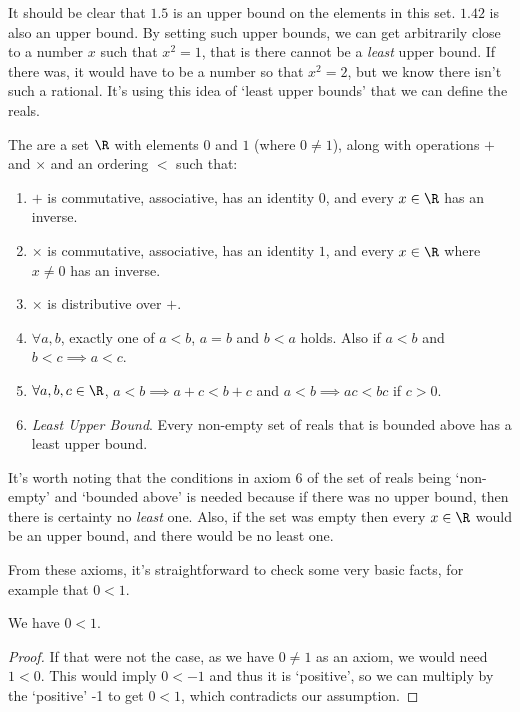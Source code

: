 \documentclass[a4paper]{scrreprt}
\begin{document}
It should be clear that $1.5$ is an upper bound on the elements in this set. $1.42$ is also an upper bound. By setting such upper bounds, we can get arbitrarily close to a number $x$ such that $x^2 = 1$, that is there cannot be a \emph{least} upper bound. If there was, it would have to be a number so that $x^2 = 2$, but we know there isn't such a rational. 
It's using this idea of `least upper bounds' that we can define the reals.

\begin{definition}
	The  are a set $\R$ with elements $0$ and $1$ (where $0 \neq 1$), along with operations $+$ and $\times$ and an ordering $<$ such that:
	\begin{enumerate}
		\item $+$ is commutative, associative, has an identity $0$, and every $x \in \R$ has an inverse.
		\item $\times$ is commutative, associative, has an identity $1$, and every $x \in \R$ where $x \neq 0$ has an inverse.
		\item $\times$ is distributive over $+$.
		\item $\forall a, b$, exactly one of $a < b$, $a = b$ and $b < a$ holds. Also if $a < b$ and $b < c \implies a < c$.
		\item $\forall a, b, c \in \R$, $a < b \implies a + c < b + c$ and $a < b \implies ac < bc$ if $c > 0$.
		\item \emph{Least Upper Bound}. Every non-empty set of reals that is bounded above has a least upper bound.
	\end{enumerate}
\end{definition}

It's worth noting that the conditions in axiom 6 of the set of reals being `non-empty' and `bounded above' is needed because if there was no upper bound, then there is certainty no \emph{least} one. Also, if the set was empty then every $x \in \R$ would be an upper bound, and there would be no least one.

From these axioms, it's straightforward to check some very basic facts, for example that $0 < 1$.
\begin{example}
	We have $0 < 1$.
\end{example}
\begin{proof}
	If that were not the case, as we have $0 \neq 1$ as an axiom, we would need $1 < 0$. 
	This would imply $0 < -1$ and thus it is `positive', 
	so we can multiply by the `positive' -1 to get $0 < 1$, which contradicts our assumption.
\end{proof}
\end{document}
